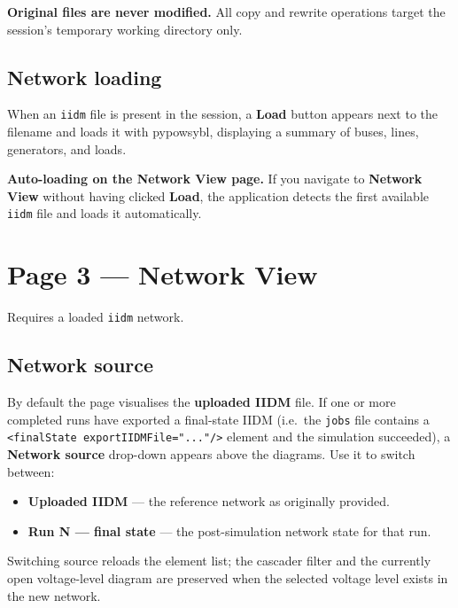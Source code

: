 \documentclass[a4paper,11pt]{article}
\newcommand{\code}[1]{\texttt{\small #1}}
\newcommand{\ftype}[1]{\texttt{\small\color{rteblu}#1}}
\begin{document}
\begin{notebox}
\textbf{Original files are never modified.} All copy and rewrite operations
target the session's temporary working directory only.
\end{notebox}

\subsection{Network loading}

When an \ftype{iidm} file is present in the session, a \textbf{Load} button
appears next to the filename and loads it with pypowsybl, displaying a summary
of buses, lines, generators, and loads.

\begin{notebox}
\textbf{Auto-loading on the Network View page.} If you navigate to
\textbf{Network View} without having clicked \textbf{Load}, the application
detects the first available \ftype{iidm} file and loads it automatically.
\end{notebox}

\section{Page 3 --- Network View}

Requires a loaded \ftype{iidm} network.

\subsection{Network source}
\label{sec:netsource}

By default the page visualises the \textbf{uploaded IIDM} file. If one or more
completed runs have exported a final-state IIDM (i.e.\ the \ftype{jobs} file
contains a \code{<finalState exportIIDMFile="..."/>} element and the simulation
succeeded), a \textbf{Network source} drop-down appears above the diagrams. Use
it to switch between:

\begin{itemize}[leftmargin=2em]
  \item \textbf{Uploaded IIDM} --- the reference network as originally provided.
  \item \textbf{Run N --- final state} --- the post-simulation network state for
    that run.
\end{itemize}

Switching source reloads the element list; the cascader filter and the currently
open voltage-level diagram are preserved when the selected voltage level exists
in the new network.
\end{document}
